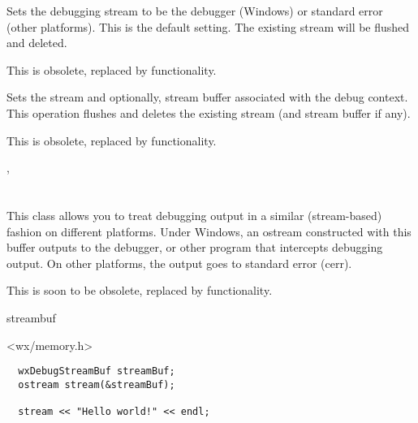 

\label{wxdebugcontextsetstandarderror}


Sets the debugging stream to be the debugger (Windows) or standard error (other platforms).
This is the default setting. The existing stream will be flushed and deleted.

This is obsolete, replaced by  functionality.

\label{wxdebugcontextsetstream}


Sets the stream and optionally, stream buffer associated with the debug context.
This operation flushes and deletes the existing stream (and stream buffer if any).

This is obsolete, replaced by  functionality.





, 

\section{}\label{wxdebugstreambuf}

This class allows you to treat debugging output in a similar
(stream-based) fashion on different platforms. Under
Windows, an ostream constructed with this buffer outputs
to the debugger, or other program that intercepts debugging
output. On other platforms, the output goes to standard error (cerr).

This is soon to be obsolete, replaced by  functionality.


streambuf


<wx/memory.h>


\begin{verbatim}
  wxDebugStreamBuf streamBuf;
  ostream stream(&streamBuf);

  stream << "Hello world!" << endl;
\end{verbatim}




